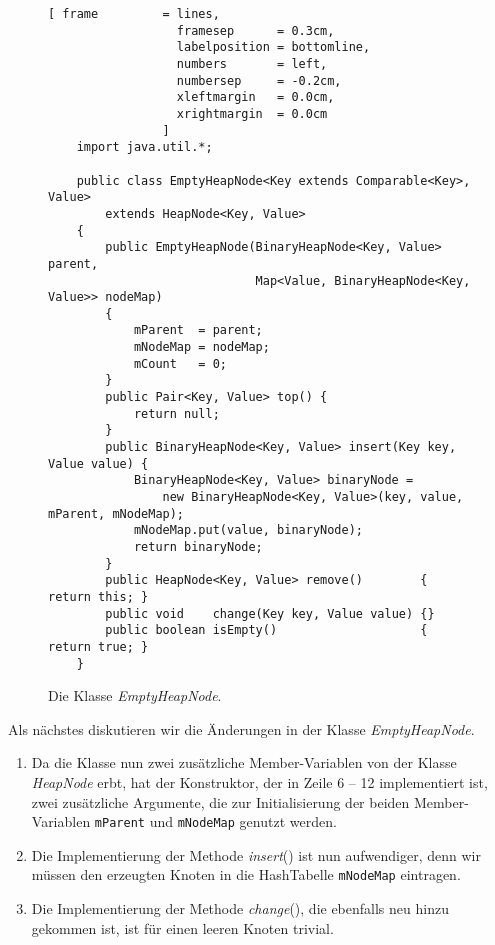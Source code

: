 \begin{figure}[!ht]
  \centering
\begin{Verbatim}[ frame         = lines, 
                  framesep      = 0.3cm, 
                  labelposition = bottomline,
                  numbers       = left,
                  numbersep     = -0.2cm,
                  xleftmargin   = 0.0cm,
                  xrightmargin  = 0.0cm
                ]
    import java.util.*;
    
    public class EmptyHeapNode<Key extends Comparable<Key>, Value> 
        extends HeapNode<Key, Value>
    {
        public EmptyHeapNode(BinaryHeapNode<Key, Value>             parent,
                             Map<Value, BinaryHeapNode<Key, Value>> nodeMap) 
        {
            mParent  = parent;
            mNodeMap = nodeMap;
            mCount   = 0;
        }    
        public Pair<Key, Value> top() {
            return null;
        }
        public BinaryHeapNode<Key, Value> insert(Key key, Value value) {
            BinaryHeapNode<Key, Value> binaryNode =
                new BinaryHeapNode<Key, Value>(key, value, mParent, mNodeMap);
            mNodeMap.put(value, binaryNode);
            return binaryNode;
        }        
        public HeapNode<Key, Value> remove()        { return this; }
        public void    change(Key key, Value value) {}
        public boolean isEmpty()                    { return true; }
    }
\end{Verbatim}
\vspace*{-0.3cm}
  \caption{Die Klasse  \textsl{EmptyHeapNode}.}
  \label{fig:EmptyHeapNode-2}
\end{figure}

Als n\"achstes diskutieren wir die \"Anderungen in der Klasse \textsl{EmptyHeapNode}.
\begin{enumerate}
\item Da die Klasse nun zwei zus\"atzliche Member-Variablen von der Klasse \textsl{HeapNode}
      erbt, hat der Konstruktor, der in Zeile 6 -- 12 implementiert ist, zwei zus\"atzliche
      Argumente, die zur Initialisierung der beiden Member-Variablen \texttt{mParent}
      und \texttt{mNodeMap} genutzt werden.
\item Die Implementierung der Methode \textsl{insert}() ist nun aufwendiger, denn wir
      m\"ussen den erzeugten Knoten in die HashTabelle \texttt{mNodeMap} eintragen.
\item Die Implementierung der Methode \textsl{change}(), die ebenfalls neu hinzu gekommen
      ist, ist f\"ur einen leeren Knoten trivial. 
\end{enumerate}

